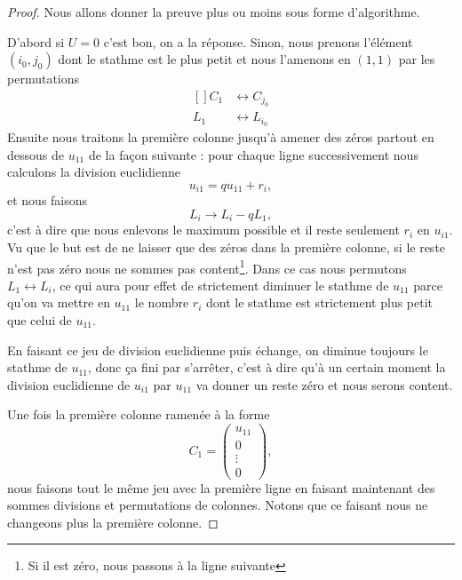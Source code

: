 \begin{proof}
    Nous allons donner la preuve plus ou moins sous forme d'algorithme.

    D'abord si \( U=0\) c'est bon, on a la réponse. Sinon, nous prenons l'élément \( (i_0,j_0)\) dont le stathme est le plus petit et nous l'amenons en \( (1,1)\) par les permutations
    \begin{equation}
        \begin{aligned}[]
            C_1&\leftrightarrow C_{j_0}\\
            L_1&\leftrightarrow L_{i_0}
        \end{aligned}
    \end{equation}
    Ensuite nous traitons la première colonne jusqu'à amener des zéros partout en dessous de \( u_{11}\) de la façon suivante : pour chaque ligne successivement nous calculons la division euclidienne
    \begin{equation}
        u_{i1}=qu_{11}+r_i,
    \end{equation}
    et nous faisons
    \begin{equation}
        L_i\to L_i-qL_1,
    \end{equation}
    c'est à dire que nous enlevons le maximum possible et il reste seulement \( r_i\) en \( u_{i1}\). Vu que le but est de ne laisser que des zéros dans la première colonne, si le reste n'est pas zéro nous ne sommes pas content\footnote{Si il est zéro, nous passons à la ligne suivante}. Dans ce cas nous permutons \( L_1\leftrightarrow L_i\), ce qui aura pour effet de strictement diminuer le stathme de \( u_{11}\) parce qu'on va mettre en \( u_{11}\) le nombre \( r_i\) dont le stathme est strictement plus petit que celui de \( u_{11}\).

    En faisant ce jeu de division euclidienne puis échange, on diminue toujours le stathme de \( u_{11}\), donc ça fini par s'arrêter, c'est à dire qu'à un certain moment la division euclidienne de \( u_{i1}\) par \( u_{11}\) va donner un reste zéro et nous serons content.

    Une fois la première colonne ramenée à la forme
    \begin{equation}
        C_1=\begin{pmatrix}
            u_{11}    \\ 
            0    \\ 
            \vdots    \\ 
            0    
        \end{pmatrix},
    \end{equation}
    nous faisons tout le même jeu avec la première ligne en faisant maintenant des sommes divisions et permutations de colonnes. Notons que ce faisant nous ne changeons plus la première colonne.


\end{proof}

